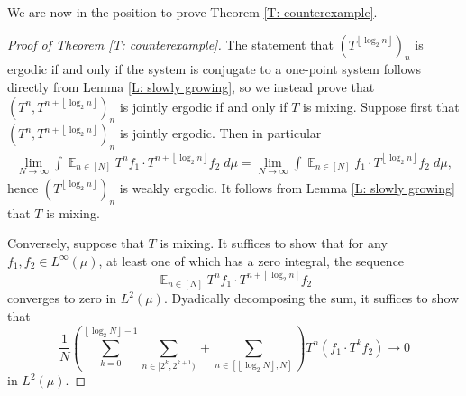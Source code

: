 \documentclass[11pt]{amsart}
\theoremstyle{definition}
\DeclareMathOperator*{\E}{\mathbb{E}}
\newcommand{\1}{{\mathbf{1}}}
\newcommand{\brac}[1]{\mathopen{}\left( #1 \mathclose{}\right)}
\newcommand{\floor}[1]{{\left \lfloor #1 \right \rfloor}}
\begin{document}
We are now in the position to prove Theorem \ref{T: counterexample}. 
\begin{proof}[Proof of Theorem \ref{T: counterexample}]
    The statement that $(T^{\floor{\log_2 n}})_n$ is ergodic if and only if the system is conjugate to a one-point system follows directly from Lemma \ref{L: slowly growing}, so we instead prove that $(T^n, T^{n+\floor{\log_2 n}})_n$ is jointly ergodic if and only if $T$ is mixing. Suppose first that $(T^n, T^{n+\floor{\log_2 n}})_n$ is jointly ergodic. Then in particular
    \begin{align*}
        \lim_{N\to\infty}\int \E_{n\in[N]}T^n f_1\cdot T^{n+\floor{\log_2 n}}f_2\; d\mu = \lim_{N\to\infty}\int \E_{n\in[N]} f_1\cdot T^{\floor{\log_2 n}}f_2\; d\mu,
    \end{align*}
    hence $(T^{\floor{\log_2 n}})_n$ is weakly ergodic. It follows from Lemma \ref{L: slowly growing} that $T$ is mixing. 
    
    Conversely, suppose that $T$ is mixing. It suffices to show that for any $f_1,f_2\in L^{\infty}(\mu)$, at least one of which has a zero integral,  the sequence \begin{equation*}
        \E_{n\in[N]} T^n f_1\cdot  T^{n+\floor{\log_2 n}}f_2 
    \end{equation*}
    converges to zero in $L^2(\mu)$.
    Dyadically decomposing the sum, it suffices to show that \begin{equation*}
        \frac{1}{N}\brac{\sum_{k=0}^{\floor{\log_2 N}-1} \sum_{n\in[2^k,2^{k+1})} + \sum_{n\in[\floor{\log_2 N}, N]}}T^n(f_1\cdot T^{k}f_2)\to 0
    \end{equation*}in $L^2(\mu)$.


\end{proof}
\end{document}
